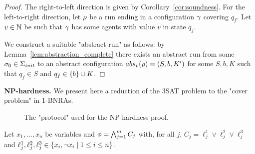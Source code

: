 \begin{proof}
	The right-to-left direction is given by Corollary~\ref{cor:soundness}.
	For the left-to-right direction, let $\rho$ be a run ending in a configuration $\gamma$ covering $q_f$. Let $v \in \mathbb{N}$ be such that $\gamma$ has some agents with value $v$ in state $q_f$.
	
	We construct a suitable "abstract run" as follows: by Lemma~\ref{lem:abstraction_complete} there exists an abstract run from some $\sigma_0 \in \aconfiginitset$ to an abstract configuration $\absproj{v}{\run} = (S, b, K')$ for some $S,b,K$ such that $q_f \in S$ and $q_f \in \{b\} \cup K$.
	
\end{proof}




\textbf{NP-hardness.} We present here a reduction of the 3SAT problem to the "cover problem" in 1-BNRAs.

\begin{figure}[h]
	
	\caption{The "protocol" used for the NP-hardness proof.}
	\label{fig:np-hard}
\end{figure}

Let $x_1, \ldots, x_n$ be variables and $\phi = \bigwedge_{j=1}^m C_j$ with, for all $j$, $C_j = \ell_j^1 \lor \ell_j^2 \lor \ell_j^3$ and $\ell_j^1, \ell_j^2, \ell_j^3 \in \{x_i, \neg x_i \mid 1 \leq i \leq n\}$. 

